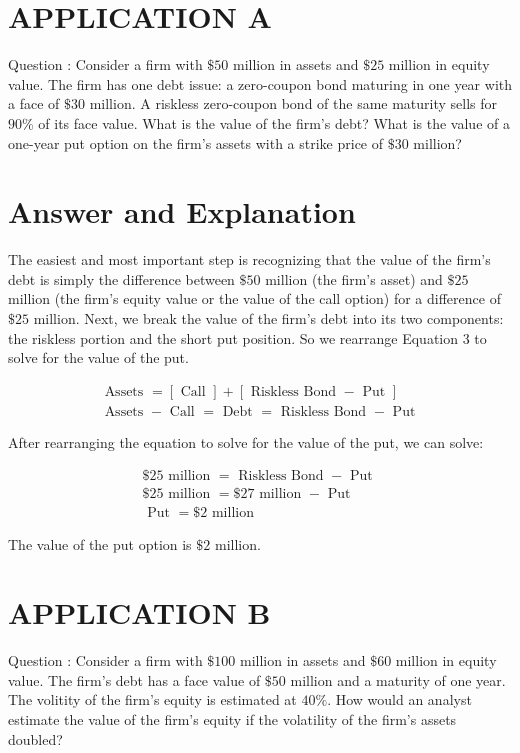 \documentclass[11pt]{article}
\begin{document}
\section*{APPLICATION A}
Question : Consider a firm with $\$ 50$ million in assets and $\$ 25$ million in equity value. The firm has one debt issue: a zero-coupon bond maturing in one year with a face of $\$ 30$ million. A riskless zero-coupon bond of the same maturity sells for $90 \%$ of its face value. What is the value of the firm's debt? What is the value of a one-year put option on the firm's assets with a strike price of $\$ 30$ million?

\section*{Answer and Explanation}
The easiest and most important step is recognizing that the value of the firm's debt is simply the difference between $\$ 50$ million (the firm's asset) and $\$ 25$ million (the firm's equity value or the value of the call option) for a difference of $\$ 25$ million. Next, we break the value of the firm's debt into its two components: the riskless portion and the short put position. So we rearrange Equation 3 to solve for the value of the put.

$$
\begin{gathered}
\text { Assets }=[\text { Call }]+[\text { Riskless Bond }- \text { Put }] \\
\text { Assets }- \text { Call }=\text { Debt }=\text { Riskless Bond }- \text { Put }
\end{gathered}
$$

After rearranging the equation to solve for the value of the put, we can solve:

$$
\begin{gathered}
\$ 25 \text { million }=\text { Riskless Bond }- \text { Put } \\
\$ 25 \text { million }=\$ 27 \text { million }- \text { Put } \\
\text { Put }=\$ 2 \text { million }
\end{gathered}
$$

The value of the put option is $\$ 2$ million.

\section*{APPLICATION B}
Question : Consider a firm with $\$ 100$ million in assets and $\$ 60$ million in equity value. The firm's debt has a face value of $\$ 50$ million and a maturity of one year. The volitity of the firm's equity is estimated at $40 \%$. How would an analyst estimate the value of the firm's equity if the volatility of the firm's assets doubled?
\end{document}
